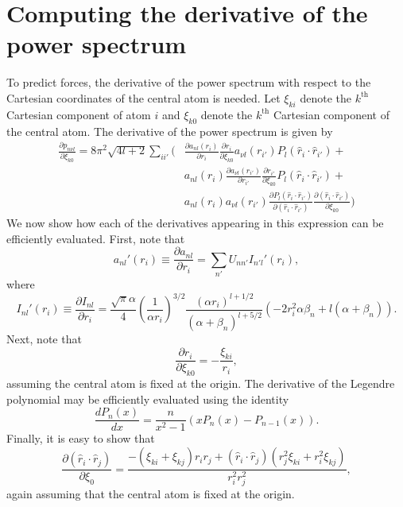 \documentclass[%
preprint,
amsmath,amssymb,
aps,
]{revtex4-1}
\begin{document}
\section{Computing the derivative of the power spectrum}
To predict forces, the derivative of the power spectrum with respect to the Cartesian coordinates of the central atom is needed. Let $\xi_{ki}$ denote the $k^{\text{th}}$ Cartesian component of atom $i$ and $\xi_{k0}$ denote the $k^{\text{th}}$ Cartesian component of the central atom. The derivative of the power spectrum is given by
\begin{equation}
    \boxed{
\begin{split}
\frac{\partial p_{n\nu l}}{\partial \xi_{k0}} = 8 \pi^2 \sqrt{4l + 2} \sum_{ii'} \bigg( &\frac{\partial a_{nl}(r_i)}{\partial r_i} \frac{\partial r_i}{\partial \xi_{k0}} a_{\nu l}(r_{i'}) P_l(\hat{r}_i \cdot \hat{r}_{i'}) + \\
&a_{nl}(r_i) \frac{\partial a_{\nu l}(r_{i'})}{\partial r_{i'}} \frac{\partial r_{i'}}{\partial \xi_{k0}} P_l(\hat{r}_i \cdot \hat{r}_{i'}) + \\
&a_{nl}(r_i) a_{\nu l}(r_{i'}) \frac{\partial P_l(\hat{r}_i \cdot \hat{r}_{i'})}{\partial (\hat{r}_i \cdot \hat{r}_{i'})} \frac{{\partial (\hat{r}_i \cdot \hat{r}_{i'})}}{\partial \xi_{k0}}  \bigg)
\end{split}
    }
\end{equation}
We now show how each of the derivatives appearing in this expression can be efficiently evaluated. First, note that
\begin{equation}
a_{nl}'(r_i) \equiv \frac{\partial a_{nl}}{\partial r_i} = \sum_{n'} U_{n n'} I_{n'l}'(r_i),
\end{equation}
where
\begin{equation}
I_{nl}'(r_i) \equiv \frac{\partial I_{nl}}{\partial r_i} = \frac{\sqrt{\pi}\alpha}{4} \left(\frac{1}{\alpha r_i} \right)^{3/2} \frac{(\alpha r_i)^{l+1/2}}{(\alpha+\beta_n)^{l+5/2}} (-2 r_i^2 \alpha \beta_n + l(\alpha+\beta_n)).
\end{equation}
Next, note that
\begin{equation}
\frac{\partial r_i}{\partial \xi_{k0}} = -\frac{\xi_{ki}}{r_i},
\end{equation}
assuming the central atom is fixed at the origin. The derivative of the Legendre polynomial may be efficiently evaluated using the identity
\begin{equation}
\frac{d P_n(x)}{d x} = \frac{n}{x^2-1}(x P_n(x) - P_{n-1}(x)).
\end{equation}
Finally, it is easy to show that
\begin{equation}
\frac{\partial (\hat{r}_i \cdot \hat{r}_j)}{\partial \xi_0} = \frac{-(\xi_{ki} + \xi_{kj}) r_i r_j + (\hat{r}_i \cdot \hat{r}_j)(r_j^2 \xi_{ki}+r_i^2 \xi_{kj})}{r_i^2 r_j^2},
\end{equation}
again assuming that the central atom is fixed at the origin.
\end{document}
